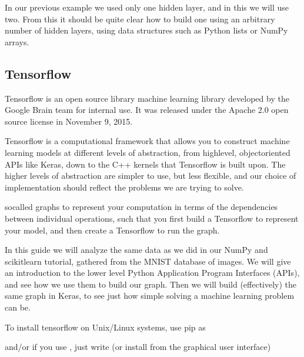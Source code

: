 \documentclass[letterpaper,10pt,english]{sphinxmanual}
\begin{document}
In our previous example we used only one hidden layer, and in this we will use two. From this it should be quite
clear how to build one using an arbitrary number of hidden layers, using data structures such as Python lists or
NumPy arrays.


\subsection{Tensorflow}
\label{\detokenize{chapter6:tensorflow}}
Tensorflow is an open source library machine learning library
developed by the Google Brain team for internal use. It was released
under the Apache 2.0 open source license in November 9, 2015.

Tensorflow is a computational framework that allows you to construct
machine learning models at different levels of abstraction, from
high\sphinxhyphen{}level, object\sphinxhyphen{}oriented APIs like Keras, down to the C++ kernels
that Tensorflow is built upon. The higher levels of abstraction are
simpler to use, but less flexible, and our choice of implementation
should reflect the problems we are trying to solve.

 so\sphinxhyphen{}called graphs to represent your computation
in terms of the dependencies between individual operations, such that you first build a Tensorflow 
to represent your model, and then create a Tensorflow  to run the graph.

In this guide we will analyze the same data as we did in our NumPy and
scikit\sphinxhyphen{}learn tutorial, gathered from the MNIST database of images. We
will give an introduction to the lower level Python Application
Program Interfaces (APIs), and see how we use them to build our graph.
Then we will build (effectively) the same graph in Keras, to see just
how simple solving a machine learning problem can be.

To install tensorflow on Unix/Linux systems, use pip as

\begin{sphinxVerbatim}[commandchars=\\\{\}]
  
\end{sphinxVerbatim}

and/or if you use , just write (or install from the graphical user interface)

\begin{sphinxVerbatim}[commandchars=\\\{\}]
  
\end{sphinxVerbatim}
\end{document}
